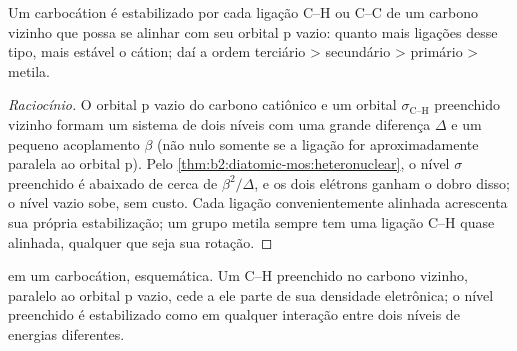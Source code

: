 \begin{proposition}\label{prop:b2:fragment-orbitals:hyperconjugation}
Um carbocátion é estabilizado por cada ligação C--H ou C--C de um carbono
vizinho que possa se alinhar com seu orbital p vazio: quanto mais ligações
desse tipo, mais estável o cátion; daí a ordem terciário > secundário >
primário > metila.
\end{proposition}

\begin{proof}[Raciocínio]
O orbital p vazio do carbono catiônico e um orbital $\sigma_{\text{C--H}}$
preenchido vizinho formam um sistema de dois níveis com uma grande diferença
$\Delta$ e um pequeno acoplamento $\beta$ (não nulo somente se a ligação for
aproximadamente paralela ao orbital p). Pelo
\cref{thm:b2:diatomic-mos:heteronuclear}, o nível $\sigma$ preenchido é abaixado
de cerca de $\beta^2/\Delta$, e os dois elétrons ganham o dobro disso; o nível
vazio sobe, sem custo. Cada ligação convenientemente alinhada acrescenta sua
própria estabilização; um grupo metila sempre tem uma ligação C--H quase
alinhada, qualquer que seja sua rotação.
\end{proof}

\begin{omfigure}

{\small {} em um carbocátion, esquemática. Um  C--H
preenchido no carbono vizinho, paralelo ao orbital p vazio, cede a ele parte
de sua densidade eletrônica; o nível preenchido é estabilizado como em
qualquer interação entre dois níveis de energias diferentes.}
\end{omfigure}

